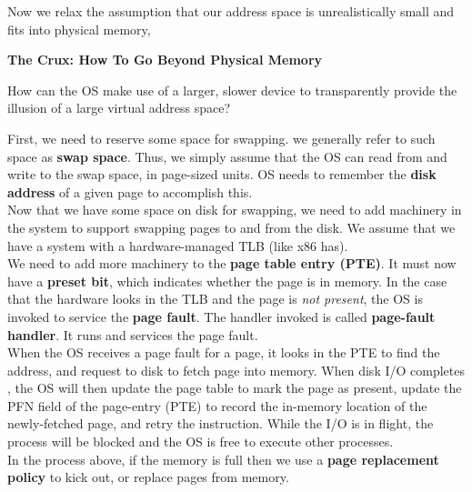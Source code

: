 Now we relax the assumption that our address space is unrealistically small
and fits into physical memory,

\begin{tcolorbox}
    \begin{center}
        \textbf{The Crux: How To Go Beyond Physical Memory}
    \end{center}

    How can the OS make use of a larger, slower device to transparently provide
    the illusion of a large virtual address space?
\end{tcolorbox}

First, we need to reserve some space for swapping. we generally refer to such
space as \textbf{swap space}. Thus, we simply assume that the OS can read from
and write to the swap space, in page-sized units. OS needs to remember the
\textbf{disk address} of a given page to accomplish this.\\

Now that we have some space on disk for swapping, we need to add machinery in
the system to support swapping pages to and from the disk. We assume that we
have a system with a hardware-managed TLB (like x86 has).\\

We need to add more machinery to the \textbf{page table entry (PTE)}. It must
now have a \textbf{preset bit}, which indicates whether the page is in memory.
In the case that the hardware looks in the TLB and the page is \textit{not
present}, the OS is invoked to service the \textbf{page fault}. The handler
invoked is called \textbf{page-fault handler}. It runs and services the page
fault.\\

When the OS receives a page fault for a page, it looks in the PTE to find the
address, and request to disk to fetch page into memory. When disk I/O completes
, the OS will then update the page table to mark the page as present, update
the PFN field of the page-entry (PTE) to record the in-memory location of
the newly-fetched page, and retry the instruction. While the I/O is in flight, 
the process will be blocked and the OS is free to execute other processes.\\

In the process above, if the memory is full then we use a \textbf{page
replacement policy} to kick out, or replace pages from memory.
